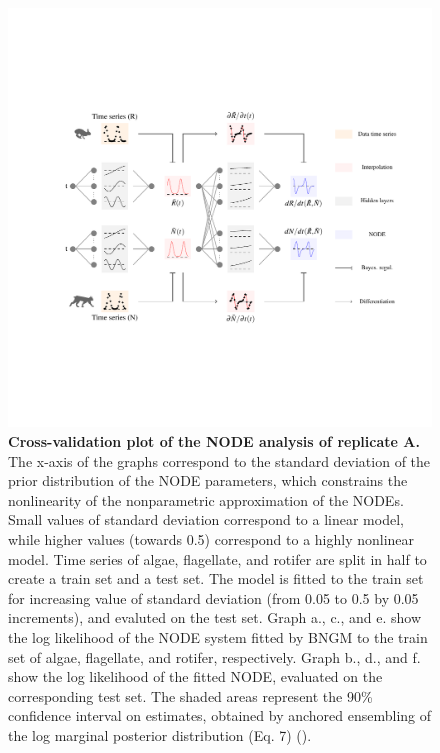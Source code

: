 \documentclass[11pt, oneside]{article}
\begin{document}
\newpage
\begin{figure}[H]
\includegraphics[width=1\linewidth,page=8]{figures/main.pdf}
\caption{
    \textbf{Cross-validation plot of the NODE analysis of replicate A.}
    The x-axis of the graphs correspond to the standard deviation of the prior distribution of the NODE parameters, which constrains the nonlinearity of the nonparametric approximation of the NODEs.
    Small values of standard deviation correspond to a linear model, while higher values (towards 0.5) correspond to a highly nonlinear model.
    Time series of algae, flagellate, and rotifer are split in half to create a train set and a test set. 
    The model is fitted to the train set for increasing value of standard deviation (from 0.05 to 0.5 by 0.05 increments), and evaluted on the test set.
    Graph a., c., and e. show the log likelihood of the NODE system fitted by BNGM to the train set of algae, flagellate, and rotifer, respectively.
    Graph b., d., and f. show the log likelihood of the fitted NODE, evaluated on the corresponding test set.
    The shaded areas represent the 90\% confidence interval on estimates, obtained by anchored ensembling of the log marginal posterior distribution (Eq. 7) (\cite{Pearce2018}).
}
\end{figure}
\newpage
\end{document}
